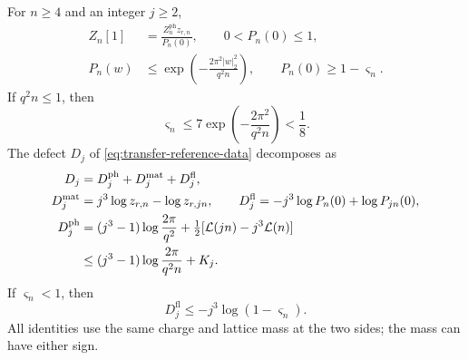 \begin{proposition}\label{prop:transfer-flux-defect}
For $n\ge4$ and an integer $j\ge2$,
\begin{align}
 Z_n[1]&=\frac{Z_n^{\mathrm{ph}}z_{r,n}}{P_n(0)},
                  \qquad 0<P_n(0)\le1,\label{eq:transfer-zero-factor}\\
 P_n(w)&\le\exp\left(-\frac{2\pi^2|w|_2^2}{q^2n}\right),
 \qquad P_n(0)\ge1-\varsigma_n. \label{eq:transfer-flux-weight}
\end{align}
If $q^2n\le1$, then
\begin{equation}\label{eq:transfer-flux-small}
 \varsigma_n\le7\exp\left(-\frac{2\pi^2}{q^2n}\right)<\frac18.
\end{equation}
The defect $D_j$ of \eqref{eq:transfer-reference-data}
decomposes as
\begin{align}
 D_j&=D_j^{\mathrm{ph}}+D_j^{\mathrm{mat}}+D_j^{\mathrm{fl}},
                                      \label{eq:transfer-defect-split}\\
 D_j^{\mathrm{mat}}&=j^3\log z_{r,n}-\log z_{r,jn},
 \qquad
 D_j^{\mathrm{fl}}=-j^3\log P_n(0)+\log P_{jn}(0),\notag\\
 D_j^{\mathrm{ph}}
   &=(j^3-1)\log\frac{2\pi}{q^2}
                +\tfrac12[\mathcal L(jn)-j^3\mathcal L(n)]\notag\\
   &\le(j^3-1)\log\frac{2\pi}{q^2n}+K_j.
                                      \label{eq:transfer-photon-defect}
\end{align}
If $\varsigma_n<1$, then
\begin{equation}\label{eq:transfer-flux-defect}
 D_j^{\mathrm{fl}}\le-j^3\log(1-\varsigma_n).
\end{equation}
All identities use the same charge and lattice mass at
the two sides; the mass can have either sign.
\end{proposition}

